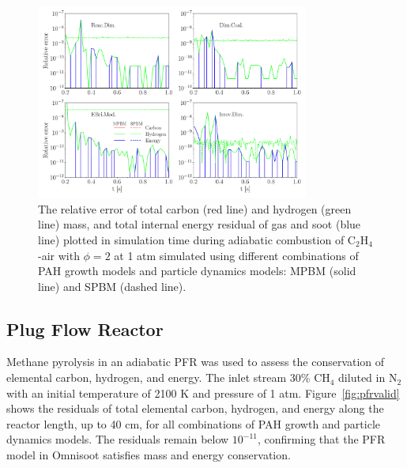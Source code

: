 \begin{figure}[H]
	\centering
	\includegraphics[width=0.8\textwidth]{Figures/Results/Validation/PSR/relerr_psr.pdf}
	\caption{The relative error of total carbon (red line) and hydrogen (green line) mass, and total internal energy residual of gas and soot (blue line) plotted in simulation time during adiabatic combustion of $\mathrm{C_2H_4}$-air with $\phi=2$ at 1 atm simulated using different combinations of PAH growth models and particle dynamics models: MPBM (solid line) and SPBM (dashed line).}
	\label{fig:psrvalid}
\end{figure}


\subsection{Plug Flow Reactor}
Methane pyrolysis in an adiabatic PFR was used to assess the conservation of elemental carbon, hydrogen, and energy. The inlet stream 30\% $\mathrm{CH_4}$ diluted in $\mathrm{N_2}$ with an initial temperature of 2100 K and pressure of 1 atm. Figure~\ref{fig:pfrvalid} shows the residuals of total elemental carbon, hydrogen, and energy along the reactor length, up to 40 cm, for all combinations of PAH growth and particle dynamics models. The residuals remain below $10^{-11}$, confirming that the PFR model in Omnisoot satisfies mass and energy conservation.

